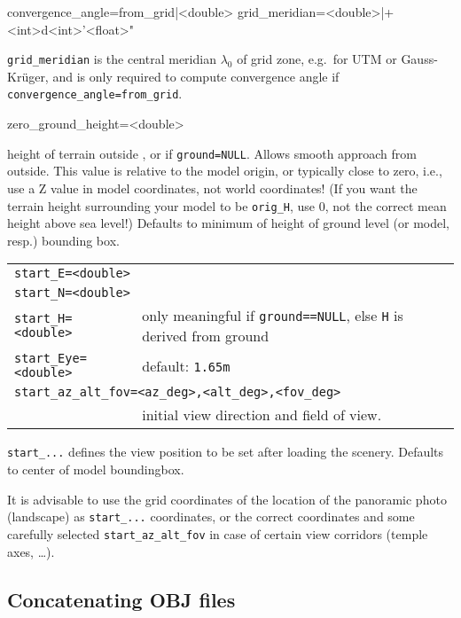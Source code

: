\begin{configfile}
convergence_angle=from_grid|<double> 
grid_meridian=<double>|+<int>d<int>'<float>"      
\end{configfile}

\noindent \texttt{grid\_meridian} is the central meridian $\lambda_0$ of grid
zone, e.g.\ for UTM or Gauss-Kr\"uger, and is only required to compute
convergence angle if \texttt{convergence\_angle=from\_grid}.



\begin{configfile}
zero_ground_height=<double> 
\end{configfile}
height of terrain outside , or if \verb|ground=NULL|.
Allows smooth approach from outside.  This value is relative to the model
origin, or typically close to zero, i.e.,  use a Z value in model coordinates,
not world coordinates! (If you want the terrain height surrounding your model to
be \texttt{orig\_H}, use 0, not the correct mean height above sea level!)  Defaults
to minimum of height of ground level (or model, resp.) bounding box.

\begin{tabularx}{\textwidth}{lX} 
\multicolumn{2}{l}{\texttt{start\_E=<double>}}\\ 
\multicolumn{2}{l}{\texttt{start\_N=<double>}} \\
\texttt{start\_H=<double>}     &only meaningful if \texttt{ground==NULL}, else \texttt{H} is derived from ground \\
\texttt{start\_Eye=<double>}   &default: \texttt{1.65m} \\
\multicolumn{2}{l}{\texttt{start\_az\_alt\_fov=<az\_deg>,<alt\_deg>,<fov\_deg>}}\\
\                                &initial view direction and field of view.\\
\end{tabularx}

\noindent \texttt{start\_...} defines the view position to be set after loading the scenery.
Defaults to center of model boundingbox.

It is advisable to use the grid coordinates of the location of the panoramic
photo (landscape) as \texttt{start\_...} coordinates, or the correct coordinates
and some carefully selected \texttt{start\_az\_alt\_fov} in case of certain view
corridors (temple axes, \ldots).

\subsection{Concatenating OBJ files}
\label{sec:scenery3d:concatenating}

